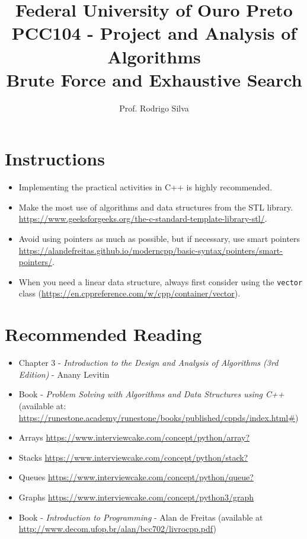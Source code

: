 \documentclass{article}
\title{\vspace{-2 cm}Federal University of Ouro Preto \\ PCC104 - Project and Analysis of Algorithms \\ Brute Force and Exhaustive Search}
\author{Prof. Rodrigo Silva}
\begin{document}
\maketitle

\section*{Instructions}

\begin{itemize}
    \item Implementing the practical activities in C++ is highly recommended.
    \item Make the most use of algorithms and data structures from the STL library. \url{https://www.geeksforgeeks.org/the-c-standard-template-library-stl/}.
    \item Avoid using pointers as much as possible, but if necessary, use smart pointers \url{https://alandefreitas.github.io/moderncpp/basic-syntax/pointers/smart-pointers/}.
    \item When you need a linear data structure, always first consider using the \texttt{vector} class (\url{https://en.cppreference.com/w/cpp/container/vector}).
\end{itemize}

\section{Recommended Reading}

\begin{itemize}
    \item Chapter 3 - \textit{Introduction to the Design and Analysis of Algorithms (3rd Edition)} - Anany Levitin
    \item Book - \textit{Problem Solving with Algorithms and Data Structures using C++} (available at: \url{https://runestone.academy/runestone/books/published/cppds/index.html#})
    \item Arrays \url{https://www.interviewcake.com/concept/python/array?}
    \item Stacks \url{https://www.interviewcake.com/concept/python/stack?}
    \item Queues \url{https://www.interviewcake.com/concept/python/queue?}
    \item Graphs \url{https://www.interviewcake.com/concept/python3/graph}
    \item Book - \textit{Introduction to Programming} - Alan de Freitas (available at \url{http://www.decom.ufop.br/alan/bcc702/livrocpp.pdf})
\end{itemize}
\end{document}
